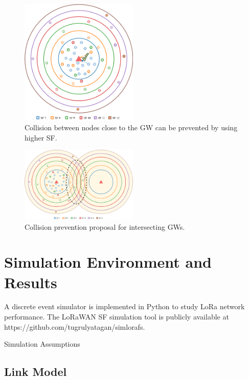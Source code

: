 \documentclass[conference]{IEEEtran}
\begin{document}
\begin{figure}
\centering
\includegraphics[width=0.5\textwidth]{collision_solution_single_gw}
\caption{Collision between nodes close to the GW can be prevented by using higher SF.}
\label{fig:collision_solution_single_gw}
\end{figure}

\begin{figure}
\centering
\includegraphics[width=0.5\textwidth]{collision_solution_multi_gw}
\caption{Collision prevention proposal for intersecting GWs.}
\label{fig:collision_solution_multi_gw}
\end{figure}


\section{Simulation Environment and Results} \label{Simulation Environment and Results}
\par A discrete event simulator is implemented in Python to study LoRa network performance. The LoRaWAN SF simulation tool is publicly available at https://github.com/tugrulyatagan/simlorafs.

Simulation Assumptions

\subsection{Link Model}
\par [TODO] 
\end{document}
